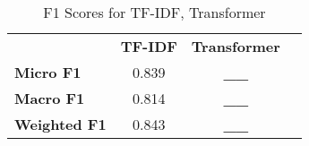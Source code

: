 \documentclass[12pt]{article}
\begin{document}
\begin{table}[hbtp]
  {\begin{tabular}{lccc}
    \toprule 
    \bfseries  & \bfseries TF-IDF  & \bfseries Transformer \\ 
    \bfseries Micro F1 &  0.839  & \bfseries __ \\ 
    \bfseries Macro F1 &  0.814  & \bfseries __ \\ 
    \bfseries Weighted F1 &  0.843  & \bfseries __ \\ 
    \bottomrule
  \end{tabular}}
  {\caption{F1 Scores for TF-IDF, Transformer}}
\end{table}
\end{document}
